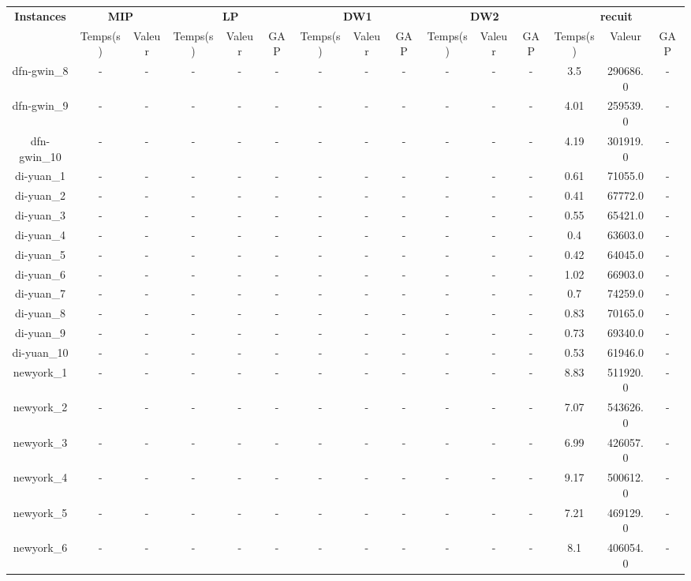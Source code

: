 \documentclass[main.tex]{subfiles}
\begin{document}
\begin{landscape}
\begin{table}[h]
    \centering
    \begin{tabular}{c|cc|ccc|ccc|ccc|ccc}
	\hline	
	\textbf{Instances} &\multicolumn{2}{c}{\textbf{MIP}} &\multicolumn{3}{c}{\textbf{LP}} &\multicolumn{3}{c}{\textbf{DW1}} &\multicolumn{3}{c}{\textbf{DW2}} &\multicolumn{3}{c}{\textbf{recuit}}\\
	 &Temps(s) &Valeur &Temps(s) &Valeur &GAP &Temps(s) &Valeur &GAP &Temps(s) &Valeur &GAP &Temps(s) &Valeur &GAP\\

	\hline
	dfn-gwin\_8 &- &- &- &- &- &- &- &- &- &- &- &3.5 &290686.0 &-\\
	dfn-gwin\_9 &- &- &- &- &- &- &- &- &- &- &- &4.01 &259539.0 &-\\
	dfn-gwin\_10 &- &- &- &- &- &- &- &- &- &- &- &4.19 &301919.0 &-\\
	di-yuan\_1 &- &- &- &- &- &- &- &- &- &- &- &0.61 &71055.0 &-\\
	di-yuan\_2 &- &- &- &- &- &- &- &- &- &- &- &0.41 &67772.0 &-\\
	di-yuan\_3 &- &- &- &- &- &- &- &- &- &- &- &0.55 &65421.0 &-\\
	di-yuan\_4 &- &- &- &- &- &- &- &- &- &- &- &0.4 &63603.0 &-\\
	di-yuan\_5 &- &- &- &- &- &- &- &- &- &- &- &0.42 &64045.0 &-\\
	di-yuan\_6 &- &- &- &- &- &- &- &- &- &- &- &1.02 &66903.0 &-\\
	di-yuan\_7 &- &- &- &- &- &- &- &- &- &- &- &0.7 &74259.0 &-\\
	di-yuan\_8 &- &- &- &- &- &- &- &- &- &- &- &0.83 &70165.0 &-\\
	di-yuan\_9 &- &- &- &- &- &- &- &- &- &- &- &0.73 &69340.0 &-\\
	di-yuan\_10 &- &- &- &- &- &- &- &- &- &- &- &0.53 &61946.0 &-\\
	newyork\_1 &- &- &- &- &- &- &- &- &- &- &- &8.83 &511920.0 &-\\
	newyork\_2 &- &- &- &- &- &- &- &- &- &- &- &7.07 &543626.0 &-\\
	newyork\_3 &- &- &- &- &- &- &- &- &- &- &- &6.99 &426057.0 &-\\
	newyork\_4 &- &- &- &- &- &- &- &- &- &- &- &9.17 &500612.0 &-\\
	newyork\_5 &- &- &- &- &- &- &- &- &- &- &- &7.21 &469129.0 &-\\
	newyork\_6 &- &- &- &- &- &- &- &- &- &- &- &8.1 &406054.0 &-\\

\end{tabular}
\end{table}
\end{landscape}
\end{document}
